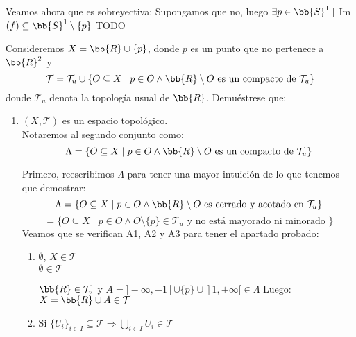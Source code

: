 \documentclass[12pt]{article}
\newcounter{ejercicio}[section] %
\newcounter{ejercicio}
\begin{document}
\begin{ejercicio}[2.5 puntos]
\begin{enumerate}
                \noindent
                Veamos ahora que es sobreyectiva:\newline
                Supongamos que no, luego $\exists p \in \bb{S}^1 \mid$ Im$(f) \subseteq \bb{S}^1 \setminus \{p\}$\newline
                TODO


        \end{enumerate}
    \end{ejercicio}


    \begin{ejercicio}[3 puntos]
        Consideremos $X = \bb{R} \cup \{p\}$, donde $p$ es un punto que no pertenece a $\bb{R}^2$ y 
        $$\mathcal{T} = \mathcal{T}_u \cup \{O \subseteq X \mid p \in O \land \bb{R}\setminus O \mbox{ es un compacto de } \mathcal{T}_u\}$$
        donde $\mathcal{T}_u$ denota la topología usual de $\bb{R}$. Demuéstrese que:
        \begin{enumerate}[label=(\alph*)]
            \item $(X,\mathcal{T})$ es un espacio topológico.\\

                \noindent
                Notaremos al segundo conjunto como:
                $$\Lambda = \{O \subseteq X \mid p \in O \land \bb{R}\setminus O \mbox{ es un compacto de } \mathcal{T}_u\} $$

                \noindent
                Primero, reescribimos $\Lambda$ para tener una mayor intuición de lo que tenemos que demostrar:
                $$\Lambda = \{O \subseteq X \mid p \in O \land \bb{R}\setminus O \mbox{ es cerrado y acotado en } \mathcal{T}_u\} $$
                $$ = \{ O \subseteq X \mid p \in O \land O \setminus \{p\} \in \mathcal{T}_u \mbox{ y no está mayorado ni minorado }\}$$
                Veamos que se verifican A1, A2 y A3 para tener el apartado probado:

                \begin{enumerate}
                    \item[A1)] $\emptyset$, $X \in \mathcal{T}$\\
                        
                        \noindent
                        $\emptyset \in \mathcal{T}$

                        \noindent
                        $\bb{R} \in \mathcal{T}_u$ y $A = ]-\infty, -1[ \cup \{p\} \cup ]1, +\infty[ \in \Lambda$\newline
                        Luego: $X = \bb{R} \cup A \in \mathcal{T}$
                    \item[A2)] Si $\{U_i\}_{i \in I} \subseteq \mathcal{T} \Rightarrow \displaystyle \bigcup_{i \in I} U_i \in \mathcal{T}$\\


\end{enumerate}
\end{enumerate}
\end{ejercicio}
\end{document}
